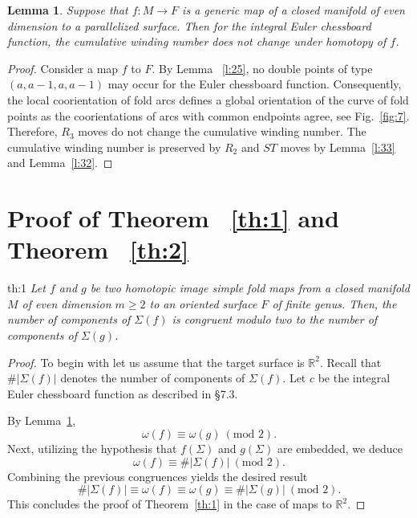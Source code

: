 \documentclass[12pt]{amsart}
\def \R{\mathbb{R}}
\def\co{\colon}
\newtheorem{lemma}[theorem]{Lemma}
\theoremstyle{definition}
\begin{document}
{ \begin{lemma}\label{le:9.17} Suppose that $f\co M\to F$ is a generic map of a closed manifold of even dimension to a parallelized surface. Then for the integral Euler chessboard function,  the cumulative winding number does not change under homotopy of $f$. 
  \end{lemma}
 \begin{proof}   Consider a map $f$ to $F$. By Lemma ~\ref{l:25}, no double points of type $(a,a-1,a,a-1)$ may occur for the Euler chessboard function.  Consequently, the local coorientation of fold arcs defines a global orientation of the curve of fold points as the coorientations of arcs with common endpoints agree, see Fig.~\ref{fig:7}. Therefore, $R_3$ moves do not change the cumulative winding number. The cumulative winding number is preserved by $R_2$ and $ST$ moves by Lemma~\ref{l:33} and Lemma~\ref{l:32}.

\end{proof}
 

 \section{Proof of Theorem ~\ref{th:1} and Theorem ~\ref{th:2}}

\begin{reptheorem}{th:1}
\textit{ Let $f$ and $g$ be two homotopic image simple fold maps 
from a closed manifold $M$ of even dimension  $m\geq2$ to an oriented surface $F$ of finite genus.   
Then,  the number of components of $\Sigma(f)$ is congruent modulo two to the number of components of $\Sigma(g)$. }
\end{reptheorem}


\begin{proof}
To begin with let us assume that the target surface is $\R^2$.
 Recall that $\#|\Sigma(f)|$ denotes the number of components of $\Sigma(f)$.  Let $c$ be the integral Euler chessboard function as described in \S7.3. 
 
  By Lemma~\ref{le:9.17}, 
 \[
 \omega(f) \equiv \omega(g) ~(\textrm{mod\ } 2).
 \]
Next, utilizing the hypothesis that $f(\Sigma)$ and $g(\Sigma)$ are embedded, we deduce 
\[
\omega(f) \equiv \#|\Sigma(f)| ~(\textrm{mod\ } 2). 
\]
Combining the previous congruences yields the desired result
\[
 \#|\Sigma(f)| \equiv \omega(f) \equiv \omega(g) \equiv  \#|\Sigma(g)| ~(\textrm{mod\ } 2) .
\]
 This concludes the proof of Theorem~\ref{th:1} in the case of maps to $\R^2$. 
 

\end{proof}}
\end{document}
